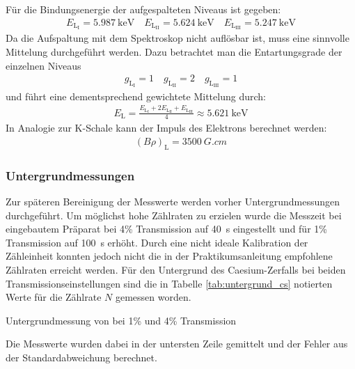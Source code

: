 \documentclass[11pt, a4paper]{article}
\numberwithin{equation}{section}
\begin{document}
Für die Bindungsenergie der aufgespalteten Niveaus ist gegeben:
\begin{align*}
E_{\mathrm{L}_{\mathrm{I}}} = \SI{5,987}{\kilo\electronvolt} \quad
E_{\mathrm{L}_{\mathrm{II}}} = \SI{5,624}{\kilo\electronvolt} \quad
E_{\mathrm{L}_{\mathrm{III}}} = \SI{5,247}{\kilo\electronvolt}
\end{align*}
Da die Aufspaltung mit dem Spektroskop nicht auflösbar ist, muss eine sinnvolle Mittelung durchgeführt werden.
Dazu betrachtet man die Entartungsgrade der einzelnen Niveaus
\begin{align*}
g_{\mathrm{L}_{\mathrm{I}}} = \num{1} \quad
g_{\mathrm{L}_{\mathrm{II}}} = \num{2} \quad
g_{\mathrm{L}_{\mathrm{III}}} = \num{1}
\end{align*}
und führt eine dementsprechend gewichtete Mittelung durch:
\begin{align*}
E_\mathrm{L} = \frac{E_{\mathrm{L}_{\mathrm{I}}} + 2E_{\mathrm{L}_{\mathrm{II}}} + E_{\mathrm{L}_{\mathrm{III}}}}{4} \approx \SI{5,621}{\kilo\electronvolt}
\end{align*}
In Analogie zur K-Schale kann der Impuls des Elektrons berechnet werden:
\begin{align}
\left(B \rho \right)_\mathrm{L} = \SI{3500}{G.cm}
\end{align}

\subsubsection{Untergrundmessungen}
\label{sssec:untergrund1}
Zur späteren Bereinigung der Messwerte werden vorher Untergrundmessungen durchgeführt.
Um möglichst hohe Zählraten zu erzielen wurde die Messzeit bei eingebautem Präparat bei 4\% Transmission auf \SI{40}{\second} eingestellt und für 1\% Transmission auf \SI{100}{\second} erhöht.
Durch eine nicht ideale Kalibration der Zähleinheit konnten jedoch nicht die in der Praktikumsanleitung empfohlene Zählraten erreicht werden.
Für den Untergrund des Caesium-Zerfalls bei beiden Transmissionseinstellungen sind die in Tabelle \ref{tab:untergrund_cs} notierten Werte für die Zählrate $N$ gemessen worden.
\begin{table}[h]
	\centering
	
	\caption{Untergrundmessung von  bei 1\% und 4\% Transmission}
	\label{tab:untergrund_cs}
\end{table}
Die Messwerte wurden dabei in der untersten Zeile gemittelt und der Fehler aus der Standardabweichung berechnet.
\end{document}
